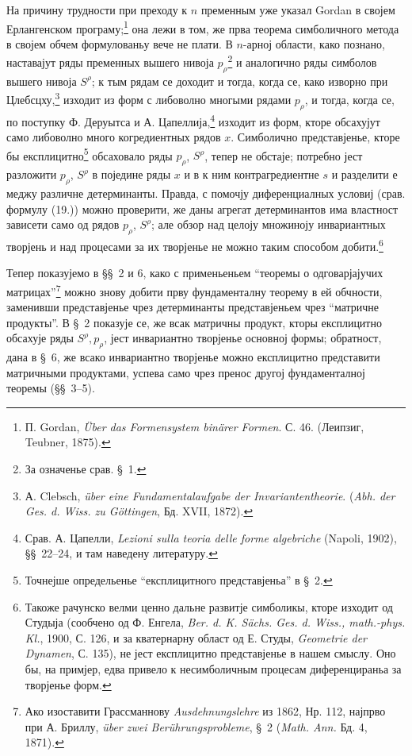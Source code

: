﻿\documentclass[11pt]{article}
\begin{document}
На причину трудности при преходу к $n$ пременным уже указал Gordan в својем Ерлангенском програму;\footnote{П. Gordan, \emph{Über das Formensystem binärer Formen}. С. 46. (Леипзиг, Teubner, 1875).} она лежи в том, же прва теорема симболичного метода в својем обчем формулованьу вече не плати. В $n$-арној области, како познано, наставајут ряды пременных вышего нивоја $p_\rho$\footnote{За означенье срав. \S\ 1.} и аналогично ряды симболов вышего нивоја $S^\rho$; к тым рядам се доходит и тогда, когда се, како изворно при Цлебсцху,\footnote{А. Clebsch, \emph{über eine Fundamentalaufgabe der Invariantentheorie}. (\emph{Abh. der Ges. d. Wiss. zu Göttingen}, Бд. XVII, 1872).} изходит из форм с либоволно многыми рядами $p_\rho$, и тогда, когда се, по поступку Ф. Деруытса и А. Цапеллија,\footnote{Срав. А. Цапелли, \emph{Lezioni sulla teoria delle forme algebriche} (Napoli, 1902), \S\S\ 22--24, и там наведену литературу.} изходит из форм, кторе обсахујут само либоволно много когредиентных рядов $x$. Симболично представјенье, кторе бы експлицитно\footnote{Точнејше определьенье ``експлицитного представјеньа'' в \S\ 2.} обсаховало ряды $p_\rho$, $S^\rho$, тепер не обстаје; потребно јест разложити $p_\rho$, $S^\rho$ в поједине ряды $x$ и в к ним контрагредиентне $s$ и разделити е меджу различне детерминанты. Правда, с помочју диференциалных условиј (срав. формулу (19.)) можно проверити, же даны агрегат детерминантов има властност зависети само од рядов $p_\rho$, $S^\rho$; але обзор над целоју множиноју инвариантных творјень и над процесами за их творјенье не можно таким способом добити.\footnote{Такоже рачунско велми ценно дальне развитје симболикы, кторе изходит од Студыја (сообчено од Ф. Енгела, \emph{Ber. d. K. Sächs. Ges. d. Wiss., math.-phys. Kl.}, 1900, С. 126, и за кватернарну област од Е. Студы, \emph{Geometrie der Dynamen}, С. 135), не јест експлицитно представјенье в нашем смыслу. Оно бы, на примјер, едва привело к несимболичным процесам диференцираньа за творјенье форм.}

Тепер показујемо в \S\S\ 2 и 6, како с применьеньем ``теоремы о одговарјајучих матрицах''\footnote{Ако изоставити Грассманнову \emph{Ausdehnungslehre} из 1862, Нр. 112, најпрво при А. Бриллу, \emph{über zwei Berührungsprobleme}, \S\ 2 (\emph{Math. Ann.} Бд. 4, 1871).} можно знову добити прву фундаменталну теорему в ей обчности, заменивши представјенье чрез детерминанты представјеньем чрез ``матричне продукты''. В \S\ 2 показује се, же всак матричны продукт, кторы експлицитно обсахује ряды $S^\rho,p_\rho$, јест инвариантно творјенье основној формы; обратност, дана в \S\ 6, же всако инвариантно творјенье можно експлицитно представити матричными продуктами, успева само чрез пренос другој фундаменталној теоремы (\S\S\ 3--5).
\end{document}
